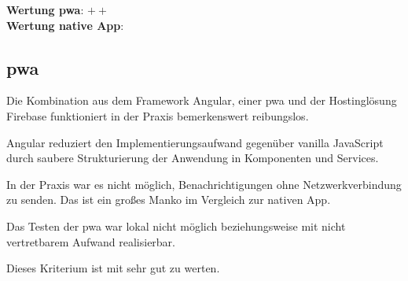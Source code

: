 \textbf{Wertung \ac{pwa}}: $++$\\
\textbf{Wertung native App}:  \\

\subsection{\ac{pwa}}
Die Kombination aus dem Framework Angular, einer \ac{pwa} und der Hostinglösung Firebase funktioniert in der Praxis bemerkenswert reibungslos.

Angular reduziert den Implementierungsaufwand gegenüber vanilla JavaScript durch saubere Strukturierung der Anwendung in Komponenten und Services.

In der Praxis war es nicht möglich, Benachrichtigungen ohne Netzwerkverbindung zu senden. Das ist ein großes Manko im Vergleich zur nativen App.

Das Testen der \ac{pwa} war lokal nicht möglich beziehungsweise mit nicht vertretbarem Aufwand realisierbar.

Dieses Kriterium ist mit sehr gut zu werten.